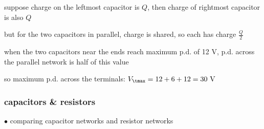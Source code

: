 \sol suppose charge on the leftmost capacitor is $Q$, then charge of rightmost capacitor is also $Q$

but for the two capacitors in parallel, charge is shared, so each has charge $\frac{Q}{2}$

when the two capacitors near the ends reach maximum p.d. of 12 V, p.d. across the parallel network is half of this value

so maximum p.d. across the terminals: $V_\tmax = 12 + 6 + 12 = 30 \text{ V}$ \eoe




\subsubsection{capacitors \& resistors}

$\bullet$ comparing capacitor networks and resistor networks

